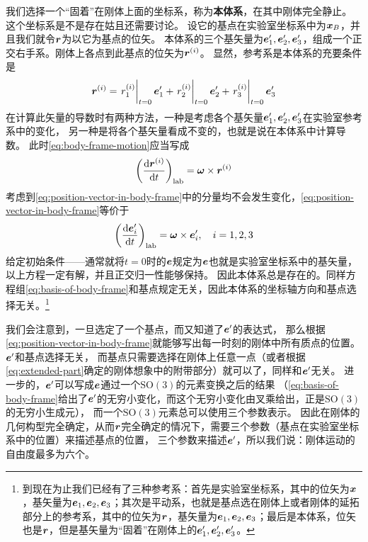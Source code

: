 \documentclass[UTF8, a4paper]{ctexart}
\newcommand*{\sogroup}[1]{\mathrm{SO}(#1)}
\begin{document}
我们选择一个“固着”在刚体上面的坐标系，称为\textbf{本体系}，在其中刚体完全静止。
这个坐标系是不是存在姑且还需要讨论。
设它的基点在实验室坐标系中为$\vb*{x}_B$，并且我们就令$\vb*{r}$为以它为基点的位矢。
本体系的三个基矢量为$\vb*{e}'_1, \vb*{e}'_2, \vb*{e}'_3$，组成一个正交右手系。刚体上各点到此基点的位矢为$\vb*{r}^{(i)}$。
显然，参考系是本体系的充要条件是
\begin{equation}
    \vb*{r}^{(i)} = 
    \eval{r^{(i)}_1}_{t=0} \vb*{e}'_1 + \eval{r^{(i)}_2}_{t=0} \vb*{e}'_2 + \eval{r^{(i)}_3}_{t=0} \vb*{e}'_3
    \label{eq:position-vector-in-body-frame}
\end{equation}
在计算此矢量的导数时有两种方法，一种是考虑各个基矢量$\vb*{e}'_1, \vb*{e}'_2, \vb*{e}'_3$在实验室参考系中的变化，
另一种是将各个基矢量看成不变的，也就是说在本体系中计算导数。
此时\eqref{eq:body-frame-motion}应当写成
\[
    \left( \dv{\vb*{r}^{(i)}}{t} \right)_\text{lab} = \vb*{\omega} \times \vb*{r}^{(i)}
\]
考虑到\eqref{eq:position-vector-in-body-frame}中的分量均不会发生变化，\eqref{eq:position-vector-in-body-frame}等价于
\begin{equation}
    \left( \dv{\vb*{e}_i'}{t} \right)_\text{lab} = \vb*{\omega} \times \vb*{e}'_i, \quad i = 1, 2, 3
    \label{eq:basis-of-body-frame}
\end{equation}
给定初始条件——通常就将$t=0$时的$\vb*{e}$规定为$\vb*{e}$也就是实验室坐标系中的基矢量，以上方程一定有解，并且正交归一性能够保持。
因此本体系总是存在的。同样方程组\eqref{eq:basis-of-body-frame}和基点规定无关，因此本体系的坐标轴方向和基点选择无关。\footnote{到现在为止我们已经有了三种参考系：首先是实验室坐标系，其中的位矢为$\vb*{x}$，基矢量为$\vb*{e}_1, \vb*{e}_2, \vb*{e}_3$；其次是平动系，也就是基点选在刚体上或者刚体的延拓部分上的参考系，其中的位矢为$\vb*{r}$，基矢量为$\vb*{e}_1, \vb*{e}_2, \vb*{e}_3$；最后是本体系，位矢也是$\vb*{r}$，但是基矢量为“固着”在刚体上的$\vb*{e}'_1, \vb*{e}'_2, \vb*{e}'_3$。}

我们会注意到，一旦选定了一个基点，而又知道了$\vb*{e}'$的表达式，
那么根据\eqref{eq:position-vector-in-body-frame}就能够写出每一时刻的刚体中所有质点的位置。
$\vb*{e}'$和基点选择无关，
而基点只需要选择在刚体上任意一点（或者根据\eqref{eq:extended-part}确定的刚体想象中的附带部分）就可以了，同样和$\vb*{e}'$无关。
进一步的，$\vb*{e}'$可以写成$\vb*{e}$通过一个$\sogroup{3}$的元素变换之后的结果
（\eqref{eq:basis-of-body-frame}给出了$\vb*{e}'$的无穷小变化，而这个无穷小变化由叉乘给出，正是$\sogroup{3}$的无穷小生成元），
而一个$\sogroup{3}$元素总可以使用三个参数表示。
因此在刚体的几何构型完全确定，从而$\vb*{r}$完全确定的情况下，需要三个参数（基点在实验室坐标系中的位置）来描述基点的位置，
三个参数来描述$\vb*{e}'$，所以我们说：刚体运动的自由度最多为六个。
\end{document}
